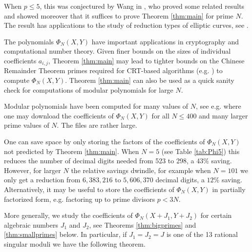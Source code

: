 \documentclass[11pt]{amsart}
\theoremstyle{definition}
\begin{document}
When $p\leq 5$, this was conjectured by Wang in \cite{WANG202614}, who proved some related results and showed moreover that it suffices to prove Theorem \ref{thm:main} for prime $N$. The result has applications to the study of reduction types of elliptic curves, see \cite{Wang2025}.

The polynomials $\Phi_N(X,Y)$ have important applications in cryptography and computational number theory. Given finer bounds on the sizes of individual coefficients $a_{i,j}$, Theorem \ref{thm:main} may lead to tighter bounds on the Chinese Remainder Theorem primes required for CRT-based algorithms (e.g. \cite{BLS2012, BOS2016, CL2005, KD2025}) to compute $\Phi_N(X,Y)$. Theorem \ref{thm:main} can also be used as a quick sanity check for computations of modular polynomials for large $N$.

Modular polynomials have been computed for many values of $N$, see e.g. \cite{Sutherland-website} where one may download the coefficients of $\Phi_N(X,Y)$ for all $N \leq 400$ and many larger prime values of $N$. The files are rather large.

One can save space by only storing the factors of the coefficients of $\Phi_N(X,Y)$ not predicted by Theorem \ref{thm:main}. When $N=5$ (see Table \ref{tab:Phi5}) this reduces the number of decimal digits needed from 523 to 298, a $43\%$ saving. However, for larger $N$ the relative savings dwindle, for example when $N=101$ we only get a reduction from $6,383,216$ to $5,606,370$ decimal digits, a  $12\%$ saving. Alternatively, it may be useful to store the coefficients of $\Phi_N(X,Y)$ in partially factorized form, e.g. factoring up to prime divisors $p < 3N$.

\medskip

More generally, we study the coefficients of $\Phi_N(X+J_1, Y+J_2)$ for certain algebraic numbers $J_1$ and $J_2$, see Theorems \ref{thm:bigprimes} and \ref{thm:smallprimes} below. 
In particular, if $J_1 = J_2 = J$ is one of the 13 rational singular moduli we have the following theorem.
\end{document}
